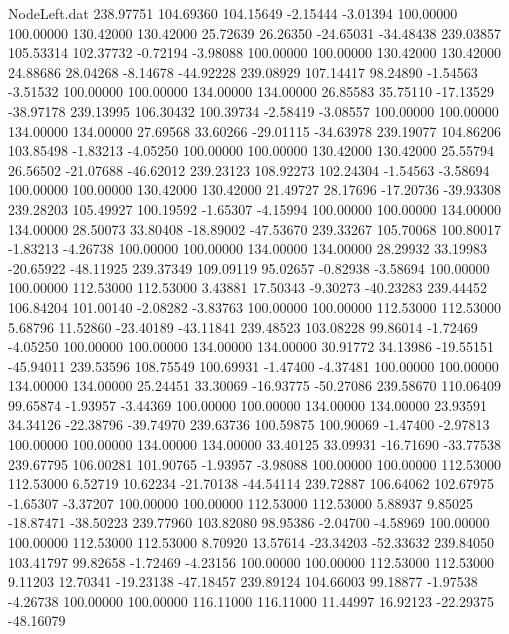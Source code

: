 \begin{filecontents}{NodeLeft.dat}
 238.97751  104.69360  104.15649    -2.15444   -3.01394  100.00000  100.00000  130.42000  130.42000   25.72639   26.26350  -24.65031  -34.48438
 239.03857  105.53314  102.37732    -0.72194   -3.98088  100.00000  100.00000  130.42000  130.42000   24.88686   28.04268   -8.14678  -44.92228
 239.08929  107.14417   98.24890    -1.54563   -3.51532  100.00000  100.00000  134.00000  134.00000   26.85583   35.75110  -17.13529  -38.97178
 239.13995  106.30432  100.39734    -2.58419   -3.08557  100.00000  100.00000  134.00000  134.00000   27.69568   33.60266  -29.01115  -34.63978
 239.19077  104.86206  103.85498    -1.83213   -4.05250  100.00000  100.00000  130.42000  130.42000   25.55794   26.56502  -21.07688  -46.62012
 239.23123  108.92273  102.24304    -1.54563   -3.58694  100.00000  100.00000  130.42000  130.42000   21.49727   28.17696  -17.20736  -39.93308
 239.28203  105.49927  100.19592    -1.65307   -4.15994  100.00000  100.00000  134.00000  134.00000   28.50073   33.80408  -18.89002  -47.53670
 239.33267  105.70068  100.80017    -1.83213   -4.26738  100.00000  100.00000  134.00000  134.00000   28.29932   33.19983  -20.65922  -48.11925
 239.37349  109.09119   95.02657    -0.82938   -3.58694  100.00000  100.00000  112.53000  112.53000    3.43881   17.50343   -9.30273  -40.23283
 239.44452  106.84204  101.00140    -2.08282   -3.83763  100.00000  100.00000  112.53000  112.53000    5.68796   11.52860  -23.40189  -43.11841
 239.48523  103.08228   99.86014    -1.72469   -4.05250  100.00000  100.00000  134.00000  134.00000   30.91772   34.13986  -19.55151  -45.94011
 239.53596  108.75549  100.69931    -1.47400   -4.37481  100.00000  100.00000  134.00000  134.00000   25.24451   33.30069  -16.93775  -50.27086
 239.58670  110.06409   99.65874    -1.93957   -3.44369  100.00000  100.00000  134.00000  134.00000   23.93591   34.34126  -22.38796  -39.74970
 239.63736  100.59875  100.90069    -1.47400   -2.97813  100.00000  100.00000  134.00000  134.00000   33.40125   33.09931  -16.71690  -33.77538
 239.67795  106.00281  101.90765    -1.93957   -3.98088  100.00000  100.00000  112.53000  112.53000    6.52719   10.62234  -21.70138  -44.54114
 239.72887  106.64062  102.67975    -1.65307   -3.37207  100.00000  100.00000  112.53000  112.53000    5.88937    9.85025  -18.87471  -38.50223
 239.77960  103.82080   98.95386    -2.04700   -4.58969  100.00000  100.00000  112.53000  112.53000    8.70920   13.57614  -23.34203  -52.33632
 239.84050  103.41797   99.82658    -1.72469   -4.23156  100.00000  100.00000  112.53000  112.53000    9.11203   12.70341  -19.23138  -47.18457
 239.89124  104.66003   99.18877    -1.97538   -4.26738  100.00000  100.00000  116.11000  116.11000   11.44997   16.92123  -22.29375  -48.16079

\end{filecontents}
